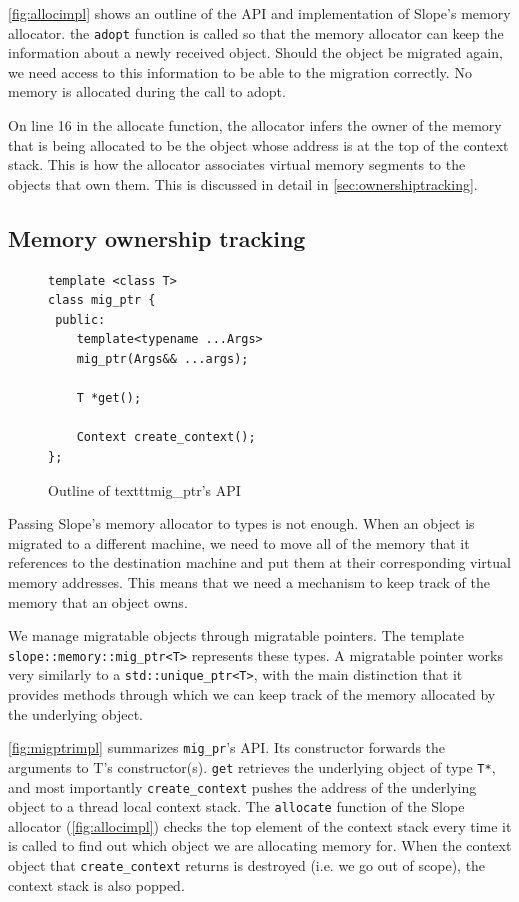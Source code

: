 \autoref{fig:allocimpl} shows an outline of the API and implementation of Slope's
memory allocator. the \texttt{adopt} function is called so that the memory
allocator can keep the information about a newly received object.
Should the object be migrated again, we need access to this information
to be able to the migration correctly. No memory is allocated during the call
to adopt.

On line 16 in the allocate function, the allocator infers
the owner of the memory that is being allocated to be the object whose
address is at the top of the context stack. This is how the allocator
associates virtual memory segments to the objects that own them. This is
discussed in detail in \autoref{sec:ownershiptracking}.



\subsection{Memory ownership tracking}
\label{sec:ownershiptracking}

\begin{figure}[tp]
\begin{lstlisting}
template <class T>
class mig_ptr {
 public:
    template<typename ...Args>
    mig_ptr(Args&& ...args);

    T *get();

    Context create_context();
};
\end{lstlisting}
    \caption{ Outline of texttt{mig\_ptr}'s API }
\label{fig:migptrimpl}
\end{figure}


Passing Slope's memory allocator to types is not enough.
When an object is migrated to a different machine, we need to move all of the
memory that it references to the destination machine and put them at their
corresponding virtual memory addresses. This means
that we need a mechanism to keep track of the memory that an object owns.


We manage migratable objects through migratable pointers. The template\\
\texttt{slope::memory::mig\_ptr<T>} represents these types. A migratable
pointer works very similarly to a \texttt{std::unique\_ptr<T>}, with the
main distinction that it provides methods through which we can keep track
of the memory allocated by the underlying object.


\autoref{fig:migptrimpl} summarizes \texttt{mig\_pr}'s API. Its
constructor forwards the arguments to
T's constructor(s). \texttt{get} retrieves the underlying object of
type \texttt{T*}, and most importantly \texttt{create\_context}
pushes the address of the underlying object to a thread local context stack.
The \texttt{allocate} function of the Slope allocator (\autoref{fig:allocimpl})
checks the top element of the context stack every time it is called to find out
which object we are allocating memory for. When the context object that
\texttt{create\_context} returns is destroyed (i.e. we go out of scope), the
context stack is also popped.


